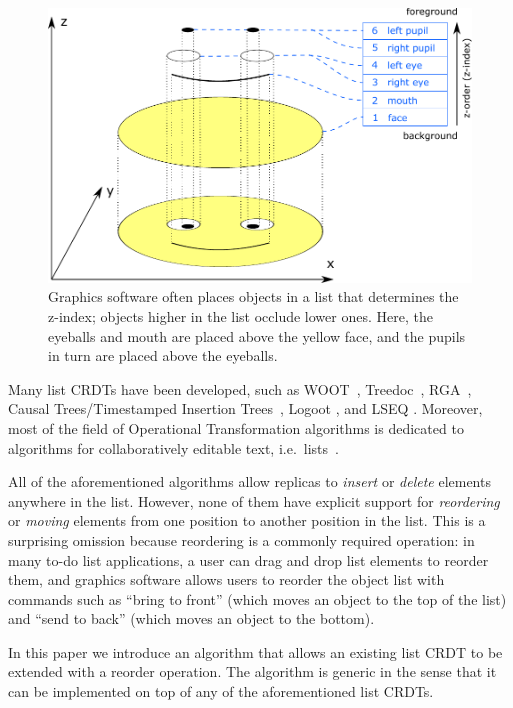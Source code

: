 \documentclass[sigplan,10pt]{acmart}
\begin{document}
\begin{figure}
  \centering
  \includegraphics{smiley.pdf}
  \caption{Graphics software often places objects in a list that determines the z-index; objects higher in the list occlude lower ones. %
    Here, the eyeballs and mouth are placed above the yellow face, and the pupils in turn are placed above the eyeballs.}
  \label{fig:smiley}
\end{figure}

Many list CRDTs have been developed, such as WOOT~\cite{Oster:2006wj}, Treedoc~\cite{Preguica:2009fz}, RGA~\cite{Roh:2011dw}, Causal Trees/Timestamped Insertion Trees~\cite{Grishchenko:2014eh,Attiya:2016kh}, Logoot \cite{Weiss:2009ht,Weiss:2010hx}, and LSEQ \cite{Nedelec:2013ky,Nedelec:2016eo}.
Moreover, most of the field of Operational Transformation algorithms is dedicated to algorithms for collaboratively editable text, i.e.\ lists~\cite{Ellis:1989ue,Nichols:1995fd,Ressel:1996wx,Sun:1998vf,Oster:2006tr}.

All of the aforementioned algorithms allow replicas to \emph{insert} or \emph{delete} elements anywhere in the list.
However, none of them have explicit support for \emph{reordering} or \emph{moving} elements from one position to another position in the list.
This is a surprising omission because reordering is a commonly required operation: in many to-do list applications, a user can drag and drop list elements to reorder them, and graphics software allows users to reorder the object list with commands such as ``bring to front'' (which moves an object to the top of the list) and ``send to back'' (which moves an object to the bottom).

In this paper we introduce an algorithm that allows an existing list CRDT to be extended with a reorder operation.
The algorithm is generic in the sense that it can be implemented on top of any of the aforementioned list CRDTs.
\end{document}
